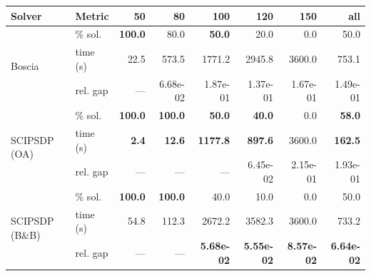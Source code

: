 \begin{tabular}{llrrrrrr}
\toprule
 Solver & Metric & 50 & 80 & 100 & 120 & 150 & all \\
\midrule
\multirow{3}{*}{Boscia} & \% sol. & \textbf{100.0} & 80.0 & \textbf{50.0} & 20.0 & 0.0 & 50.0 \\
  & time (s) & 22.5 & 573.5 & 1771.2 & 2945.8 & 3600.0 & 753.1 \\
  & rel. gap & --- & 6.68e-02 & 1.87e-01 & 1.37e-01 & 1.67e-01 & 1.49e-01 \\
\midrule
\multirow{3}{*}{SCIPSDP (OA)} & \% sol. & \textbf{100.0} & \textbf{100.0} & \textbf{50.0} & \textbf{40.0} & 0.0 & \textbf{58.0} \\
  & time (s) & \textbf{2.4} & \textbf{12.6} & \textbf{1177.8} & \textbf{897.6} & 3600.0 & \textbf{162.5} \\
  & rel. gap & --- & --- & --- & 6.45e-02 & 2.15e-01 & 1.93e-01 \\
\midrule
\multirow{3}{*}{SCIPSDP (B\&B)} & \% sol. & \textbf{100.0} & \textbf{100.0} & 40.0 & 10.0 & 0.0 & 50.0 \\
  & time (s) & 54.8 & 112.3 & 2672.2 & 3582.3 & 3600.0 & 733.2 \\
  & rel. gap & --- & --- & \textbf{5.68e-02} & \textbf{5.55e-02} & \textbf{8.57e-02} & \textbf{6.64e-02} \\
\bottomrule
\end{tabular}
